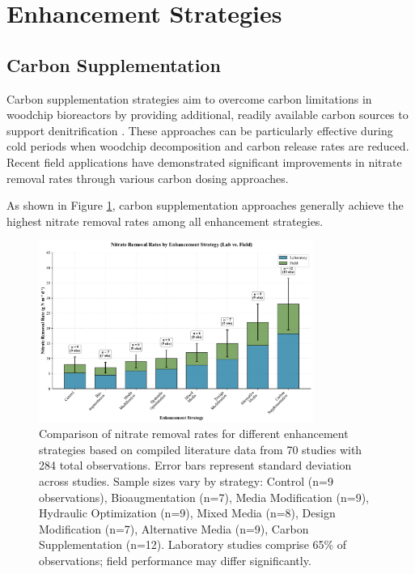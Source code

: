 \documentclass[12pt,a4paper]{article}
\begin{document}
\section{Enhancement Strategies}

\subsection{Carbon Supplementation}

Carbon supplementation strategies aim to overcome carbon limitations in woodchip bioreactors by providing additional, readily available carbon sources to support denitrification \citep{RN635, RN632}. These approaches can be particularly effective during cold periods when woodchip decomposition and carbon release rates are reduced. Recent field applications have demonstrated significant improvements in nitrate removal rates through various carbon dosing approaches.

As shown in Figure \ref{fig:removal_rates_by_strategy}, carbon supplementation approaches generally achieve the highest nitrate removal rates among all enhancement strategies.

\begin{figure}[ht]
\centering
\includegraphics[width=0.8\textwidth]{fig1_removal_rates_scientific}
\caption{Comparison of nitrate removal rates for different enhancement strategies based on compiled literature data from 70 studies with 284 total observations. Error bars represent standard deviation across studies. Sample sizes vary by strategy: Control (n=9 observations), Bioaugmentation (n=7), Media Modification (n=9), Hydraulic Optimization (n=9), Mixed Media (n=8), Design Modification (n=7), Alternative Media (n=9), Carbon Supplementation (n=12). Laboratory studies comprise 65\% of observations; field performance may differ significantly.}
\label{fig:removal_rates_by_strategy}
\end{figure}
\end{document}
